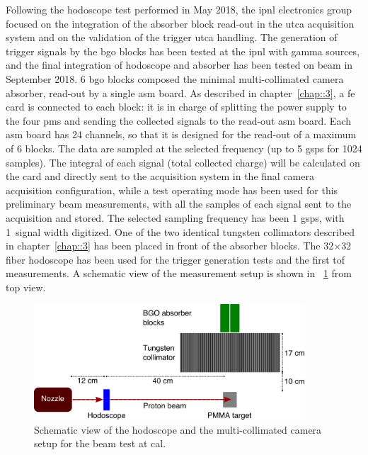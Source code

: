 Following the hodoscope test performed in May 2018, the \gls{ipnl} electronics group focused on the integration of the absorber block read-out in the \gls{utca} acquisition system and on the validation of the trigger \gls{utca} handling. The generation of trigger signals by the \gls{bgo} blocks has been tested at the \gls{ipnl} with gamma sources, and the final integration of hodoscope and absorber has been tested on beam in September 2018. 
6 \gls{bgo} blocks composed the minimal multi-collimated camera absorber, read-out by a single \gls{asm} board. As described in chapter~\ref{chap::3}, a \gls{fe} card is connected to each block: it is in charge of splitting the power supply to the four \glspl{pm} and sending the collected signals to the read-out \gls{asm} board. Each \gls{asm} board has 24 channels, so that it is designed for the read-out of a maximum of 6 blocks. The data are sampled at the selected frequency (up to 5 \gls{gsps} for 1024 samples). The integral of each signal (total collected charge) will be calculated on the card and directly sent to the acquisition system in the final camera acquisition configuration, while a test operating mode has been used for this preliminary beam measurements, with all the samples of each signal sent to the acquisition and stored. The selected sampling frequency has been 1 \gls{gsps}, with 1~\charmus signal width digitized. 
One of the two identical tungsten collimators described in chapter~\ref{chap::3} has been placed in front of the absorber blocks. The 32$\times$32 fiber hodoscope has been used for the trigger generation tests and the first \gls{tof} measurements.
A schematic view of the measurement setup is shown in \figurename~\ref{chap6::fig:-September_DAQscheme} from top view. 

\begin{figure}[!htbp]
\centering
\includegraphics[width=0.9\textwidth]{03_GraphicFiles/chapter6_BeamTests/Nice_September2018/1Dscheme.png}
\caption{Schematic view of the hodoscope and the multi-collimated camera setup for the beam test at \gls{cal}.}
\label{chap6::fig:-September_DAQscheme}
\end{figure}


